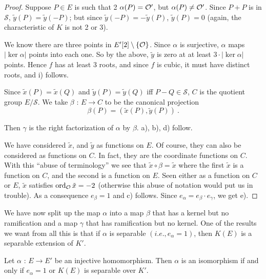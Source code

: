 \begin{proof}
Suppose $P\in E$ is such that 2 $\alpha(P)=\mathcal{O}'$, but $\alpha(P)\neq \mathcal{O}'$. Since $P + P$ is in $\mathcal{S}$, $\tilde{y} (P)=\tilde{y}(-P)$; but since $\tilde{y}(-P)=-\tilde{y}(P)$, $\tilde{y}(P)=0$ (again, the characteristic of $K$ is not 2 or 3).

We know there are three points in $E'[2]\setminus \{\mathcal{O}\}$. Since $\alpha$ is surjective, $\alpha$ maps $|\ker \alpha|$ points into each one. So by the above, $\tilde{y}$ is zero at at least $3\cdot |\ker \alpha|$ points. Hence $f$ has at least 3 roots, and since $f$ is cubic, it must have distinct roots, and i) follows.

\bigskip
Since $\tilde{x}(P)=\tilde{x}(Q)$ and $\tilde{y}(P)=\tilde{y}(Q)$ iff $P-Q\in \mathcal{S}$, $C$ is the quotient group $E/\mathcal{S}$. We take $\beta$ : $E\rightarrow C$ to be the canonical projection
$$
\beta(P)=(\tilde{x}(P),\tilde{y}(P))\ .
$$

Then $\gamma$ is the right factorization of $\alpha$ by $\beta$. a), b), d) follow.

We have considered $\tilde{x}$, and $\tilde{y}$ as functions on $E$. Of course, they can also be considered as functions on $C$. In fact, they are the coordinate functions on $C$. With this ``abuse of terminology'' we see that $\tilde{x}\circ\beta=\tilde{x}$ where the first $\tilde{x}$ is a function on $C$, and the second is a function on $E$. Seen either as a function on $C$ or $E$, $\tilde{x}$ satisfies $\operatorname{ord}_{\mathcal{O}}\tilde{x} = -2$ (otherwise this abuse of notation would put us in trouble). As a consequence $e_{\beta}=1$ and c) follows. Since $e_{\alpha}=e_{\beta}\cdot e_{\gamma}$, we get e).
\end{proof}

We have now split up the map $\alpha$ into a map $\beta$ that has a kernel but no ramification and a map $\gamma$ that has ramification but no kernel. One of the results we want from all this is that if $\alpha$ is separable $(i.e.,e_{\alpha}=1)$, then $K(E)$ is a separable extension of $K'$.

\begin{prop}
\label{p2.6.12}
Let $\alpha$ : $E\rightarrow E'$ be an injective homomorphism. Then $\alpha$ is an isomorphism if and only if $e_{\alpha}=1$ or $K(E)$ is separable over $K'$.
\end{prop}


